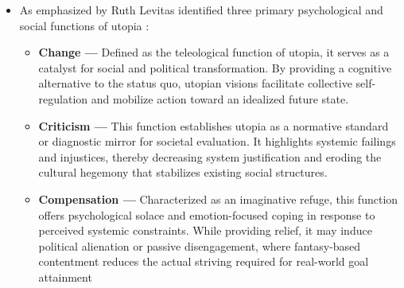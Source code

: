 \documentclass[jou,floatsintext]{apa7}
\begin{document}
\begin{itemize}
\begin{itemize}
        \item \textit{Femmutopia} --- A hybrid term describing the rise of feminist utopianism as a counter-hegemonic space that challenges established patriarchal traditions and envisions gender-neutral or female-centered social transformations \parencite[see][]{karaFemmutopiaRiseFeminist2025}
        \item \textit{Ustopia} --- A portmanteau of utopia and dystopia coined by Margaret Atwood to illustrate that the two concepts are not opposites but are inextricably linked, each containing a latent version of the other
        \item \textit{Critical Utopia} --- A term popularized by Tom Moylan to describe a 1970s subgenre that maintains the Utopian impulse while remaining critical of the limitations of the blueprint form, often incorporating elements of conflict and imperfection
        \item ...
    \end{itemize}
    \item As emphasized by \cite{fernandoFunctionsUtopiaHow2018} Ruth Levitas identified three primary psychological and social functions of utopia \parencite{levitasConceptUtopia2010}:
    \begin{itemize}
        \item \textbf{Change ---} Defined as the teleological function of utopia, it serves as a catalyst for social and political transformation. By providing a cognitive alternative to the status quo, utopian visions facilitate collective self-regulation and mobilize action toward an idealized future state.
        
        \item \textbf{Criticism ---} This function establishes utopia as a normative standard or diagnostic mirror for societal evaluation. It highlights systemic failings and injustices, thereby decreasing system justification and eroding the cultural hegemony that stabilizes existing social structures.
        
        \item \textbf{Compensation ---} Characterized as an imaginative refuge, this function offers psychological solace and emotion-focused coping in response to perceived systemic constraints. While providing relief, it may induce political alienation or passive disengagement, where fantasy-based contentment reduces the actual striving required for real-world goal attainment


\end{itemize}
\end{itemize}
\end{document}
